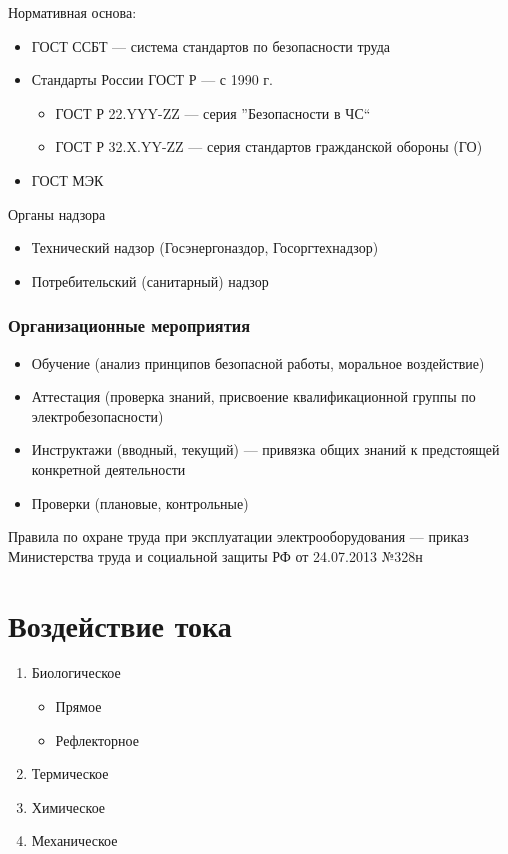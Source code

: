 \documentclass[a4paper, 14pt]{extarticle}
\begin{document}
Нормативная основа:
\begin{itemize}
    \item ГОСТ ССБТ --- система стандартов по безопасности труда
    \item Стандарты России ГОСТ Р --- с 1990 г.
    \begin{itemize}
        \item ГОСТ Р 22.YYY-ZZ --- серия ''Безопасности в ЧС``
        \item ГОСТ Р 32.X.YY-ZZ --- серия стандартов гражданской обороны (ГО)
    \end{itemize}
    \item ГОСТ МЭК
\end{itemize}

Органы надзора
\begin{itemize}
    \item Технический надзор (Госэнергоназдор, Госоргтехнадзор)
    \item Потребительский (санитарный) надзор
\end{itemize}

\subsubsection*{Организационные мероприятия}
\begin{itemize}
    \item Обучение (анализ принципов безопасной работы, моральное воздействие)
    \item Аттестация (проверка знаний, присвоение квалификационной группы по электробезопасности)
    \item Инструктажи (вводный, текущий) --- привязка общих знаний к предстоящей конкретной деятельности
    \item Проверки (плановые, контрольные)
\end{itemize}
Правила по охране труда при эксплуатации электрооборудования --- приказ Министерства труда и социальной защиты РФ от 24.07.2013 №328н

\section{Воздействие тока}
\begin{enumerate}
    \item Биологическое
    \begin{itemize}
        \item Прямое
        \item Рефлекторное
    \end{itemize}
    \item Термическое
    \item Химическое
    \item Механическое
\end{enumerate}
\end{document}
